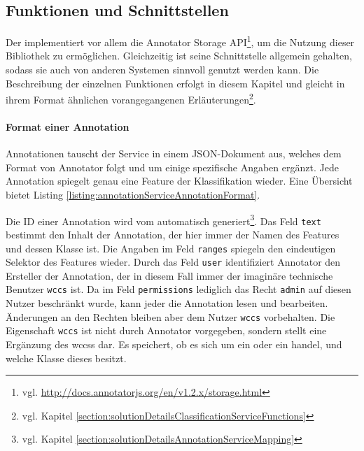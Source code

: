 \subsection{Funktionen und Schnittstellen}
    \label{section:solutionDetailsAnnotationServiceFunctions}
    Der {\annotationService} implementiert vor allem die
    Annotator Storage API\footnote{vgl. \url{http://docs.annotatorjs.org/en/v1.2.x/storage.html}},
    um die Nutzung dieser Bibliothek zu ermöglichen.
    Gleichzeitig ist seine Schnittstelle allgemein gehalten,
    sodass sie auch von anderen Systemen sinnvoll genutzt werden kann.
    Die Beschreibung der einzelnen Funktionen erfolgt in diesem Kapitel und
    gleicht in ihrem Format ähnlichen vorangegangenen
    Erläuterungen\footnote{vgl. Kapitel \ref{section:solutionDetailsClassificationServiceFunctions}}.

    \paragraph{Format einer Annotation}
    Annotationen tauscht der Service in einem JSON-Dokument aus,
    welches dem Format von Annotator folgt und um einige spezifische Angaben ergänzt.
    Jede Annotation spiegelt genau eine Feature der Klassifikation wieder.
    Eine Übersicht bietet Listing \ref{listing:annotationServiceAnnotationFormat}.

    

    Die ID einer Annotation wird vom {\annotationService} automatisch
    generiert\footnote{vgl. Kapitel \ref{section:solutionDetailsAnnotationServiceMapping}}.
    Das Feld \texttt{text} bestimmt den Inhalt der Annotation,
    der hier immer der Namen des Features und dessen Klasse ist.
    Die Angaben im Feld \texttt{ranges} spiegeln den eindeutigen Selektor des Features wieder.
    Durch das Feld \texttt{user} identifiziert Annotator den Ersteller der Annotation,
    der in diesem Fall immer der imaginäre technische Benutzer \texttt{wccs} ist.
    Da im Feld \texttt{permissions} lediglich das Recht \texttt{admin} auf diesen Nutzer beschränkt wurde,
    kann jeder die Annotation lesen und bearbeiten.
    Änderungen an den Rechten bleiben aber dem Nutzer \texttt{wccs} vorbehalten.
    Die Eigenschaft \texttt{wccs} ist nicht durch Annotator vorgegeben,
    sondern stellt eine Ergänzung des \glspl{wccs} dar.
    Es speichert, ob es sich um ein {\contentFeature} oder ein {} handel,
    und welche Klasse dieses besitzt.


